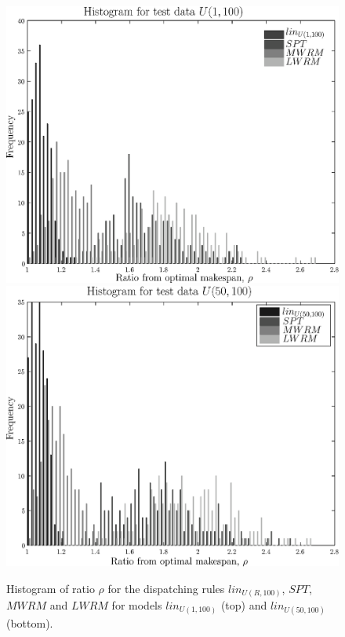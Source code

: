 \documentclass[10pt]{llncs}
\begin{document}
\begin{figure}[h!]
\centering
\includegraphics[width=0.82\columnwidth]{figs/fig3_hist_0_100.eps}
\includegraphics[width=0.82\columnwidth]{figs/fig3_hist_50_100.eps}
\caption{Histogram of ratio $\rho$ for the dispatching rules $lin_{U(R,100)}$, $SPT$, $MWRM$ and $LWRM$ for models $lin_{U(1,100)}$ (top) and $lin_{U(50,100)}$ (bottom).}
\label{fig:densities}
\end{figure}
\end{document}
